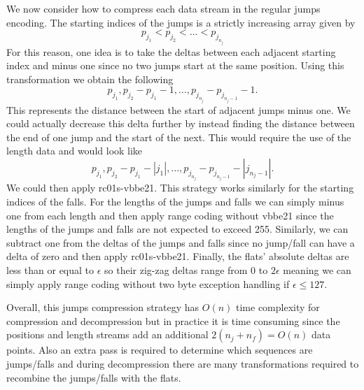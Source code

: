 We now consider how to compress each data stream in the regular jumps
encoding. The starting indices of the
jumps is a strictly increasing
array given by
\[p_{j_1}<p_{j_2}<\dots<p_{j_{n_j}}\]
For this reason, one idea is to take the deltas between each adjacent starting index
and minus one since no two jumps start at the same position. Using this
transformation we obtain the following
\[p_{j_1},p_{j_2}-p_{j_1}-1,\dots,p_{j_{n_j}}-p_{j_{n_j-1}}-1.\]
This represents the distance between the start of adjacent jumps minus one.
We could actually decrease this delta further by instead finding the distance
between the end of one jump and the start of the next. This would require the
use of the length data and would look like
\[p_{j_1},p_{j_2}-p_{j_1}-|j_1|,\dots,p_{j_{n_j}}-p_{j_{n_j-1}}-|j_{n_j-1}|.\]
We could then apply rc01s-vbbe21. This strategy works similarly for the starting
indices of the falls. For the lengths of the jumps and falls we can simply minus
one from each length and then apply range coding without vbbe21 since the
lengths of the jumps and falls are not expected to exceed 255. Similarly, we can
subtract one from the deltas of the jumps and falls since no jump/fall can have
a delta of zero and then apply rc01s-vbbe21. Finally, the flats' absolute deltas
are less than or equal to $\epsilon$ so their zig-zag deltas range from 0 to
$2\epsilon$ meaning we can simply apply range coding without two byte exception
handling if $\epsilon \le 127$.

Overall, this jumps compression strategy has $O(n)$ time complexity for
compression and decompression but in practice it is time consuming since the
positions and length streams add an additional $2(n_j+n_f)=O(n)$ data points.
Also an extra pass is required to determine which sequences are jumps/falls and
during decompression there are many transformations required to recombine the
jumps/falls with the flats.
